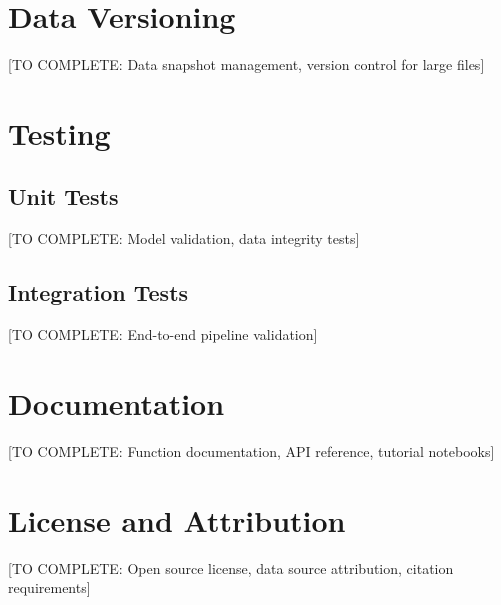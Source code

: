 \section{Data Versioning}

[TO COMPLETE: Data snapshot management, version control for large files]

\section{Testing}

\subsection{Unit Tests}

[TO COMPLETE: Model validation, data integrity tests]

\subsection{Integration Tests}

[TO COMPLETE: End-to-end pipeline validation]

\section{Documentation}

[TO COMPLETE: Function documentation, API reference, tutorial notebooks]

\section{License and Attribution}

[TO COMPLETE: Open source license, data source attribution, citation requirements]